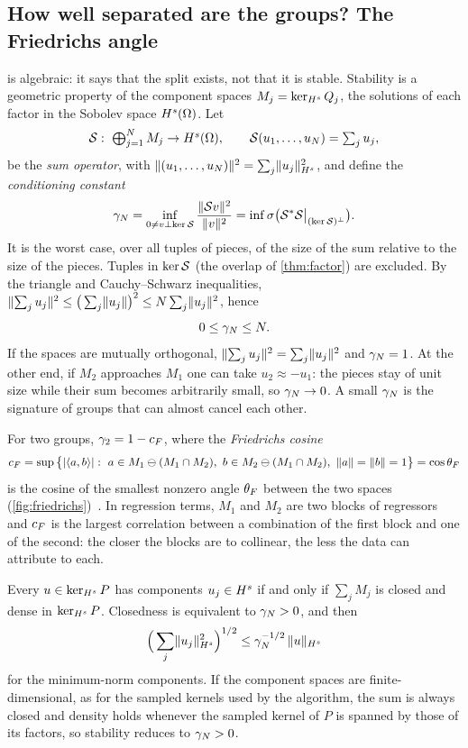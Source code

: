 \subsection{How well separated are the groups? The Friedrichs angle}\label{sec:cond}
 is algebraic: it says that the split exists, not that it is stable. Stability is a
geometric property of the component spaces $M_j=\ker_{H^{s}}Q_j$, the solutions of each factor in the
Sobolev space $H^{s}(\Omega)$. Let
\[
  \mathcal{S}:\ \textstyle\bigoplus_{j=1}^N M_j\to H^{s}(\Omega),\qquad \mathcal{S}(u_1,\dots,u_N)=\sum_ju_j,
\]
be the \emph{sum operator}, with $\lVert(u_1,\dots,u_N)\rVert^2=\sum_j\lVert u_j\rVert_{H^{s}}^2$, and define the
\emph{conditioning constant}
\begin{equation}\label{eq:gammaN}
  \gamma_{N}=\inf_{0\ne v\perp\ker\mathcal{S}}\frac{\lVert\mathcal{S} v\rVert^2}{\lVert v\rVert^2}
  =\inf\sigma\big(\mathcal{S}^*\mathcal{S}\big|_{(\ker\mathcal{S})^\perp}\big).
\end{equation}
It is the worst case, over all tuples of pieces, of the size of the sum relative to the size of the
pieces. Tuples in $\ker\mathcal{S}$ (the overlap of \cref{thm:factor}) are excluded. By the triangle and Cauchy--Schwarz inequalities,
$\lVert\sum_ju_j\rVert^2\le\big(\sum_j\lVert u_j\rVert\big)^2\le N\sum_j\lVert u_j\rVert^2$, hence
\[
  0\le\gamma_{N}\le N .
\]
If the spaces are mutually orthogonal, $\lVert\sum_ju_j\rVert^2=\sum_j\lVert u_j\rVert^2$ and $\gamma_{N}=1$. At the other end, if $M_2$
approaches $M_1$ one can take $u_2\approx-u_1$: the pieces stay of unit size while their sum becomes arbitrarily
small, so $\gamma_{N}\to0$. A small $\gamma_{N}$ is the signature of groups that can almost cancel each other.

For two groups, $\gamma_2=1-c_{F}$, where the \emph{Friedrichs cosine}
\[
  c_{F}=\sup\big\{\lvert\langle a,b\rangle\rvert:\ a\in M_1\ominus(M_1\cap M_2),\ b\in M_2\ominus(M_1\cap M_2),\
  \lVert a\rVert=\lVert b\rVert=1\big\}=\cos\theta_{F}
\]
is the cosine of the smallest nonzero angle $\theta_{F}$ between the two spaces
(\cref{fig:friedrichs})~\cite{Deu01}. In regression terms, $M_1$ and $M_2$ are two blocks of regressors and $c_{F}$ is the
largest correlation between a combination of the first block and one of the second: the closer the blocks are to
collinear, the less the data can attribute to each.

\begin{theorem}\label{thm:hm}
Every $u\in\ker_{H^{s}}P$ has components $u_j\in H^{s}$ if and only if $\sum_jM_j$ is closed and dense in
$\ker_{H^{s}}P$. Closedness is equivalent to $\gamma_{N}>0$, and then
\begin{equation}\label{eq:stability}
  \Big(\sum_j\lVert u_j\rVert_{H^{s}}^2\Big)^{1/2}\le\gamma_{N}^{-1/2}\,\lVert u\rVert_{H^{s}}
\end{equation}
for the minimum-norm components. If the component spaces are finite-dimensional, as for the sampled
kernels used by the algorithm, the sum is always closed and density holds whenever the sampled kernel of
$P$ is spanned by those of its factors, so stability reduces to $\gamma_{N}>0$.
\end{theorem}

